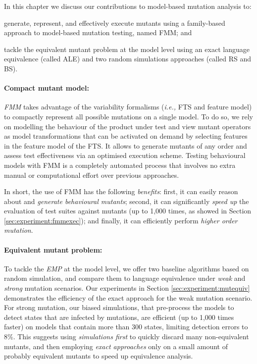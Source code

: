 In this chapter we discuss our contributions to model-based mutation analysis to: 
\begin{inparaenum}
\item generate, represent, and effectively execute mutants using a family-based approach to model-based mutation testing, named \acrfull{FMM}; and
\item tackle the equivalent mutant problem at the model level using an exact language equivalence (called \acrfull{ALE}) and two random simulations approaches (called \acrfull{RS} and \acrfull{BS}).
\end{inparaenum}

\paragraph{Compact mutant model:}

\emph{\gls{FMM}} takes advantage of the variability formalisms (\textit{i.e.,} FTS and feature model) to compactly represent all possible mutations on a single model. To do so, we rely on modelling the behaviour of the product under test and view mutant operators as model transformations that can be activated on demand by selecting features in the feature model of the FTS. It allows to generate mutants of any order and assess test effectiveness via an optimised execution scheme. Testing behavioural models with FMM is a completely automated process that involves no extra manual or computational effort over previous approaches. 

In short, the use of FMM has the following \emph{benefits}: first, it can easily reason about and \emph{generate behavioural mutants}; second, it can significantly \emph{speed up} the evaluation of test suites against mutants (up to 1,000 times, as showed in Section \ref{sec:experiment:fmmexec}); and finally, it can efficiently perform \emph{higher order mutation}. 

\paragraph{Equivalent mutant problem:}

To tackle the \emph{\acrfull{EMP}} at the model level, we offer two baseline algorithms based on random simulation, and compare them to language equivalence under \emph{weak} and \emph{strong} mutation scenarios. Our experiments in Section \ref{sec:experiment:mutequiv} demonstrates the efficiency of the exact approach for the weak mutation scenario. For strong mutation, our biased simulations, that pre-process the models to detect  states that are infected by mutations, are efficient (up to 1,000 times faster) on models that contain more than 300 states, limiting detection errors to 8\%. This suggests using \emph{simulations first} to quickly discard many non-equivalent mutants, and then employing \emph{exact approaches} only on a small amount of probably equivalent mutants to speed up equivalence analysis.      

